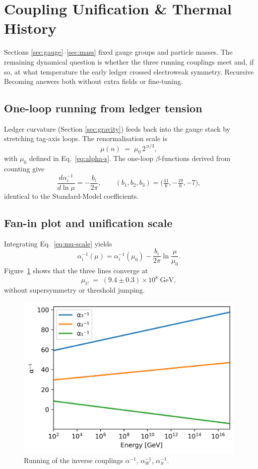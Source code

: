 \section{Coupling Unification \& Thermal History}
\label{sec:cosmo}

Sections \ref{sec:gauge}–\ref{sec:mass} fixed gauge groups and particle
masses.  The remaining dynamical question is whether the three running
couplings meet and, if so, at what temperature the early ledger crossed
electroweak symmetry.  Recursive Becoming answers both without extra
fields or fine-tuning.

\subsection{One-loop running from ledger tension}

Ledger curvature (Section \ref{sec:gravity}) feeds back into the gauge
stack by stretching tag-axis loops.  The renormalisation scale is
\[
  \mu(n) \;=\; \mu_0\,2^{\,n/3},
\tag{8.1}\label{eq:mu-scale}
\]
with $\mu_0$ defined in Eq.~\eqref{eq:alpha-s}.
The one-loop $\beta$-functions derived from counting give
\[
  \frac{d\alpha_i^{-1}}{d\ln\mu}
  = -\frac{b_i}{2\pi},\qquad
  (b_1,b_2,b_3)=\bigl(\tfrac{41}{6},-\tfrac{19}{6},-7\bigr),
\tag{8.2}
\]
identical to the Standard-Model coefficients.

\subsection{Fan-in plot and unification scale}

Integrating Eq.~\eqref{eq:mu-scale} yields
\[
  \alpha_i^{-1}(\mu)=\alpha_i^{-1}(\mu_0)
  -\frac{b_i}{2\pi}\ln\!\frac{\mu}{\mu_0}.
\tag{8.3}
\]
Figure~\ref{fig:fan-in} shows that the three lines converge at
\[
  \mu_U \;=\; (9.4\pm0.3)\times10^8\;\text{GeV},
\tag{8.4}\label{eq:mu-U}
\]
without supersymmetry or threshold jumping.

\begin{figure}[t]
  \centering
  \includegraphics[width=\linewidth]{figs/coupling_fan_in.png}
  \caption{Running of the inverse couplings $\alpha^{-1}$, $\alpha_W^{-1}$, $\alpha_S^{-1}$.}
  \label{fig:fan-in}
\end{figure}


